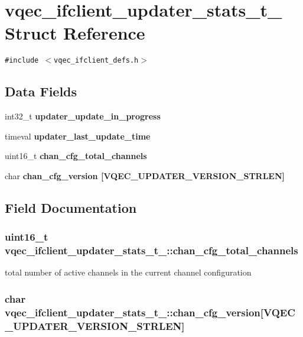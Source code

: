 \section{vqec\_\-ifclient\_\-updater\_\-stats\_\-t\_\- Struct Reference}
\label{structvqec__ifclient__updater__stats__t__}
{\tt \#include $<$vqec\_\-ifclient\_\-defs.h$>$}

\subsection*{Data Fields}
\begin{CompactItemize}
\item 
int32\_\-t \bf{updater\_\-update\_\-in\_\-progress}
\item 
timeval \bf{updater\_\-last\_\-update\_\-time}
\item 
uint16\_\-t \bf{chan\_\-cfg\_\-total\_\-channels}
\item 
char \bf{chan\_\-cfg\_\-version} [VQEC\_\-UPDATER\_\-VERSION\_\-STRLEN]
\end{CompactItemize}


\subsection{Field Documentation}
\subsubsection{\setlength{\rightskip}{0pt plus 5cm}uint16\_\-t \bf{vqec\_\-ifclient\_\-updater\_\-stats\_\-t\_\-::chan\_\-cfg\_\-total\_\-channels}}\label{structvqec__ifclient__updater__stats__t___86e41caef020c352a5847e0a2ee8fd91}


total number of active channels in the current channel configuration 
\subsubsection{\setlength{\rightskip}{0pt plus 5cm}char \bf{vqec\_\-ifclient\_\-updater\_\-stats\_\-t\_\-::chan\_\-cfg\_\-version}[VQEC\_\-UPDATER\_\-VERSION\_\-STRLEN]}\label{structvqec__ifclient__updater__stats__t___9076bc09fc0e2aabffa734d3de3161e6}


